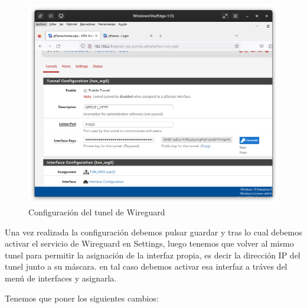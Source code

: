 \begin{figure}[H]
	\centering
	\includegraphics[scale=0.30]{05}
	\caption{Configuración del tunel de Wireguard}
\end{figure}

Una vez realizada la configuración debemos pulsar guardar y tras lo cual debemos activar el servicio de Wireguard en Settings, luego tenemos que volver al mismo tunel para permitir la asignación de la interfaz propia, es decir la dirección IP del tunel junto a su máscara. en tal caso debemos activar esa interfaz a tráves del menú de interfaces y asignarla.
\vspace{5mm}

Tenemos que poner los siguientes cambios: 

